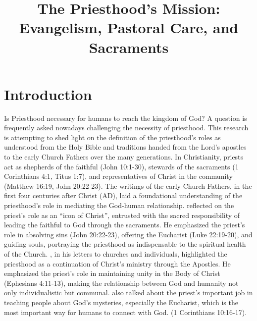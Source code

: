 \documentclass[12pt, doc]{apa7}   	%
\title{The Priesthood’s Mission: Evangelism, Pastoral Care, and Sacraments}	%
\begin{document}
\maketitle


\section{Introduction}
Is Priesthood necessary for humans to reach the kingdom of God?  A question is frequently asked nowadays challenging the necessity of priesthood.  This research is attempting to shed light on the definition of the priesthood's roles as understood from the Holy Bible and traditions handed from the Lord's apostles to the early Church Fathers over the many generations. In Christianity, priests act as shepherds of the faithful (John 10:1-30), stewards of the sacraments (1 Corinthians 4:1, Titus 1:7), and representatives of Christ in the community (Matthew 16:19, John 20:22-23). The writings of the early Church Fathers, in the first four centuries after Christ (AD), laid a foundational understanding of the priesthood’s role in mediating the God-human relationship.  \citet{priesthood_chrysostom, complete_work_chrysostom} reflected on the priest’s role as an ``icon of Christ'', entrusted with the sacred responsibility of leading the faithful to God through the sacraments. He emphasized the priest’s role in absolving sins (John 20:22-23), offering the Eucharist (Luke 22:19-20), and guiding souls, portraying the priesthood as indispensable to the spiritual health of the Church.  \citet{epistles_ignatius}, in his letters to churches and individuals, highlighted the priesthood as a continuation of Christ’s ministry through the Apostles. He emphasized the priest’s role in maintaining unity in the Body of Christ (Ephesians 4:11-13), making the relationship between God and humanity not only individualistic but communal. \citet{st_basil_letters} also talked about the priest’s important job in teaching people about God’s mysteries, especially the Eucharist, which is the most important way for humans to connect with God. (1 Corinthians 10:16-17). 
\end{document}
